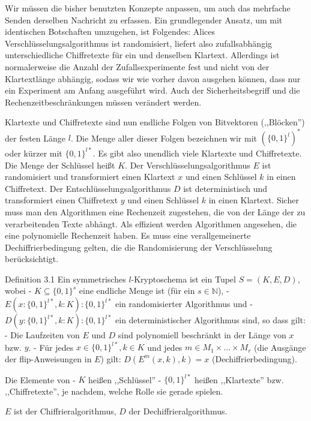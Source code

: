 \documentclass[a4paper]{article}
\begin{document}
\begin{multicols}{3}
Wir müssen die bisher benutzten Konzepte anpassen, um auch das mehrfache Senden derselben Nachricht zu erfassen. Ein grundlegender Ansatz, um mit identischen Botschaften umzugehen, ist Folgendes: Alices Verschlüsselungsalgorithmus ist randomisiert, liefert also zufallsabhängig unterschiedliche Chiffretexte für ein und denselben Klartext. Allerdings ist normalerweise die Anzahl der Zufallsexperimente fest und nicht von der Klartextlänge abhängig, sodass wir wie vorher davon ausgehen können, dass nur ein Experiment am Anfang ausgeführt wird. Auch der Sicherheitsbegriff und die Rechenzeitbeschränkungen müssen verändert werden.

Klartexte und Chiffretexte sind nun endliche Folgen von Bitvektoren (,,Blöcken'') der festen Länge $l$. Die Menge aller dieser Folgen bezeichnen wir mit $(\{0,1\}^l)^*$ oder kürzer mit $\{0,1\}^{l*}$. Es gibt also unendlich viele Klartexte und Chiffretexte. Die Menge der Schlüssel heißt $K$. Der Verschlüsselungsalgorithmus $E$ ist randomisiert und transformiert einen Klartext $x$ und einen Schlüssel $k$ in einen Chiffretext. Der Entschlüsselungsalgorithmus $D$ ist deterministisch und transformiert einen Chiffretext $y$ und einen Schlüssel $k$ in einen Klartext. Sicher muss man den Algorithmen eine Rechenzeit zugestehen, die von der Länge der zu verarbeitenden Texte abhängt. Als effizient werden Algorithmen angesehen, die eine polynomielle Rechenzeit haben. Es muss eine verallgemeinerte Dechiffrierbedingung gelten, die die Randomisierung der Verschlüsselung berücksichtigt.

Definition 3.1 Ein symmetrisches $l$-Kryptoschema ist ein Tupel $S= (K,E,D)$, wobei
  - $K\subseteq\{0,1\}^s$ eine endliche Menge ist (für ein $s\in\mathbb{N}$),
  - $E(x:\{0,1\}^{l*},k:K) :\{0,1\}^{l*}$ ein randomisierter Algorithmus und
  - $D(y:\{0,1\}^{l*},k:K) :\{0,1\}^{l*}$ ein deterministischer Algorithmus 
sind, so dass gilt:
- Die Laufzeiten von $E$ und $D$ sind polynomiell beschränkt in der Länge von $x$ bzw. $y$.
- Für jedes $x\in\{0,1\}^{l*},k\in K$ und jedes $m\in M_1\times...\times M_r$ (die Ausgänge der flip-Anweisungen in $E$) gilt: $D(E^m(x,k),k)=x$ (Dechiffrierbedingung).

Die Elemente von
- $K$ heißen ,,Schlüssel'' 
- $\{0,1\}^{l*}$ heißen ,,Klartexte'' bzw. ,,Chiffretexte'', je nachdem, welche Rolle sie gerade spielen.

$E$ ist der Chiffrieralgorithmus, $D$ der Dechiffrieralgorithmus.


\end{multicols}
\end{document}
